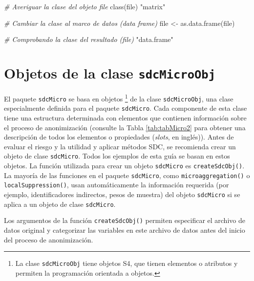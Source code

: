\documentclass[
]{book}
\newenvironment{Shaded}{\begin{snugshade}}{\end{snugshade}}
\newcommand{\CommentTok}[1]{\textcolor[rgb]{0.56,0.35,0.01}{\textit{#1}}}
\newcommand{\FunctionTok}[1]{\textcolor[rgb]{0.00,0.00,0.00}{#1}}
\newcommand{\NormalTok}[1]{#1}
\newcommand{\OtherTok}[1]{\textcolor[rgb]{0.56,0.35,0.01}{#1}}
\newcommand{\StringTok}[1]{\textcolor[rgb]{0.31,0.60,0.02}{#1}}
\theoremstyle{definition}
\theoremstyle{definition}
\theoremstyle{definition}
\theoremstyle{definition}
\theoremstyle{remark}
\begin{document}
\begin{Shaded}
\begin{Highlighting}[]
\CommentTok{\# Averiguar la clase del objeto \textquotesingle{}file\textquotesingle{}}
\FunctionTok{class}\NormalTok{(file)}
\StringTok{"matrix"}

\CommentTok{\# Cambiar la clase al marco de datos (data frame)}
\NormalTok{file }\OtherTok{\textless{}{-}} \FunctionTok{as.data.frame}\NormalTok{(file)}

\CommentTok{\# Comprobando la clase del resultado (file)}
\StringTok{"data.frame"}
\end{Highlighting}
\end{Shaded}

\hypertarget{objetos-de-la-clase-sdcmicroobj}{%
\section{\texorpdfstring{Objetos de la clase \texttt{sdcMicroObj}}{Objetos de la clase sdcMicroObj}}\label{objetos-de-la-clase-sdcmicroobj}}

El paquete \texttt{sdcMicro} se basa en objetos \footnote{La clase \texttt{sdcMicroObj} tiene objetos S4, que tienen elementos o atributos y permiten la programación orientada a objetos.} de la clase \texttt{sdcMicroObj}, una clase especialmente definida para el paquete \texttt{sdcMicro}. Cada componente de esta clase tiene una estructura determinada con elementos que contienen información sobre el proceso de anonimización (consulte la Tabla \ref{tab:tabMicro2} para obtener una descripción de todos los elementos o propiedades (\emph{slots}, en inglés)). Antes de evaluar el riesgo y la utilidad y aplicar métodos SDC, se recomienda crear un objeto de clase \texttt{sdcMicro}. Todos los ejemplos de esta guía se basan en estos objetos. La función utilizada para crear un objeto \texttt{sdcMicro} es \texttt{createSdcObj()}. La mayoría de las funciones en el paquete \texttt{sdcMicro}, como \texttt{microaggregation()} o \texttt{localSuppression()}, usan automáticamente la información requerida (por ejemplo, identificadores indirectos, pesos de muestra) del objeto \texttt{sdcMicro} si se aplica a un objeto de clase \texttt{sdcMicro}.

Los argumentos de la función \texttt{createSdcObj()} permiten especificar el archivo de datos original y categorizar las variables en este archivo de datos antes del inicio del proceso de anonimización.
\end{document}
